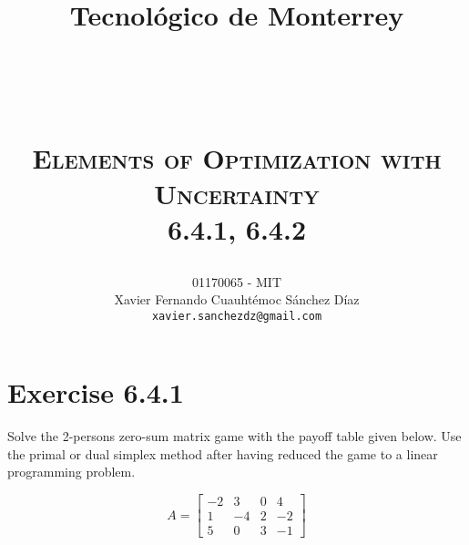 \documentclass[titlepage, letterpaper, fleqn]{article}
\title{
\vspace{1in}
\textbf{Tecnológico de Monterrey} \\
\vspace{0.5in}
\textmd{\mahclass} \\
\large{\textit{\mahteacher}} \\
\vspace{0.5in}
\textsc{\mahtitle}\\
\textsc{Elements of Optimization with Uncertainty}\\
\textsc{6.4.1, 6.4.2}\\
\author{01170065  - MIT \\
Xavier Fernando Cuauhtémoc Sánchez Díaz \\
\texttt{xavier.sanchezdz@gmail.com}}
\date{\mahdate}
}
\begin{document}
\begin{titlepage}
\maketitle
\end{titlepage}

%
%

\section{Exercise 6.4.1}

{\large Solve the 2-persons zero-sum matrix game with the payoff table given below.
Use the primal or dual simplex method after having reduced the game to a linear programming problem.

$$A =
\begin{bmatrix}
-2 & 3 & 0 & 4 \\
1 & -4 & 2 & -2 \\
5 & 0 & 3 & -1
\end{bmatrix}$$}
\end{document}
